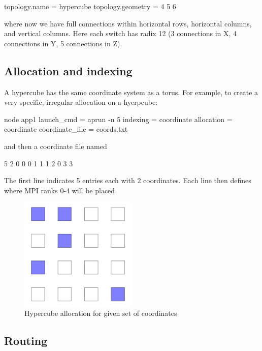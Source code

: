 \begin{ViFile}
topology.name = hypercube
topology.geometry = 4 5 6
\end{ViFile}

where now we have full connections within horizontal rows, horizontal columns, and vertical columns.
Here each switch has radix 12 (3 connections in X, 4 connections in Y, 5 connections in Z). 

\subsection{Allocation and indexing}
\label{subsec:hypercube:allocation}

A hypercube has the same coordinate system as a torus. For example, to create a very specific, irregular allocation on a hyerpcube:

\begin{ViFile}
node {
 app1 {
  launch_cmd = aprun -n 5
  indexing = coordinate
  allocation = coordinate
  coordinate_file = coords.txt
 }
}
\end{ViFile}
and then a coordinate file named 

\begin{ViFile}
5 2
0 0
0 1
1 1
2 0
3 3
\end{ViFile}
The first line indicates 5 entries each with 2 coordinates.
Each line then defines where MPI ranks 0-4 will be placed

\begin{figure}[h!]
\centering
\includegraphics[width=0.5\textwidth]{figures/tikz/hypercube/hypercube_allocation.png}
\caption{Hypercube allocation for given set of coordinates}
\label{fig:topologies:hypercubeAllocation}
\end{figure}

\subsection{Routing}
\label{subsec:hypercube:routing}

